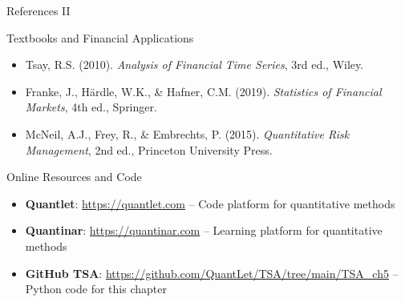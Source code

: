 \documentclass[9pt, aspectratio=169, t]{beamer}
\begin{document}
\begin{frame}{References II}
    \begin{block}{Textbooks and Financial Applications}
        {\small
        \begin{itemize}\setlength{\itemsep}{0pt}
            \item Tsay, R.S. (2010). \textit{Analysis of Financial Time Series}, 3rd ed., Wiley.
            \item Franke, J., Härdle, W.K., \& Hafner, C.M. (2019). \textit{Statistics of Financial Markets}, 4th ed., Springer.
            \item McNeil, A.J., Frey, R., \& Embrechts, P. (2015). \textit{Quantitative Risk Management}, 2nd ed., Princeton University Press.
        \end{itemize}
        }
    \end{block}

    \begin{exampleblock}{Online Resources and Code}
        {\small
        \begin{itemize}\setlength{\itemsep}{0pt}
            \item \textbf{Quantlet}: \url{https://quantlet.com} -- Code platform for quantitative methods
            \item \textbf{Quantinar}: \url{https://quantinar.com} -- Learning platform for quantitative methods
            \item \textbf{GitHub TSA}: \url{https://github.com/QuantLet/TSA/tree/main/TSA_ch5} -- Python code for this chapter
        \end{itemize}
        }
    \end{exampleblock}
\end{frame}
\end{document}
